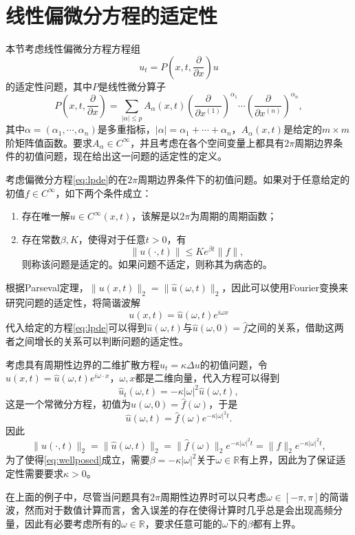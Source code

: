 \documentclass[a4paper,10pt]{ctexart}
\begin{document}
\section{线性偏微分方程的适定性}
本节考虑线性偏微分方程方程组
\begin{equation}\label{eq:lpde}
    u_t = P( x,t,\dfrac{\partial }{\partial x})u 
\end{equation}
的适定性问题，其中$ P $是线性微分算子
\begin{equation}
    P(x,t,\dfrac{\partial }{\partial x}) = \sum_{|\alpha|\leqslant p} A_\alpha(x,t) \left( \dfrac{\partial }{\partial x^{(1)}}  \right)^{\alpha_1} \cdots \left( \dfrac{\partial }{\partial x^{(n)}}  \right)^{\alpha_n},
\end{equation}
其中$ \alpha = (\alpha_1,\cdots,\alpha_n) $是多重指标，$ |\alpha| = \alpha_1 + \cdots + \alpha_n $，$ A_\alpha(x,t) $是给定的$ m\times m $阶矩阵值函数。要求$ A_\alpha\in C^\infty $，并且考虑在各个空间变量上都具有$ 2\pi $周期边界条件的初值问题，现在给出这一问题的适定性的定义。
\begin{definition}
    考虑偏微分方程\eqref{eq:lpde}的在$ 2\pi $周期边界条件下的初值问题。如果对于任意给定的初值$ f\in C^\infty $，如下两个条件成立：
    \begin{enumerate}
        \item 存在唯一解$ u\in C^\infty(x,t) $，该解是以$ 2\pi $为周期的周期函数；
        \item 存在常数$ \beta,K $，使得对于任意$ t>0 $，有
        \begin{equation}\label{eq:wellposed}
            \| u(\cdot,t) \| \leqslant Ke^{\beta t} \| f \|,
        \end{equation}
        则称该问题是适定的。如果问题不适定，则称其为病态的。
    \end{enumerate}
\end{definition}

根据Parseval定理，$ \| u(x,t) \|_2 = \| \hat{u}(\omega,t) \|_2 $，因此可以使用Fourier变换来研究问题的适定性，将简谐波解
\begin{equation}
    u(x,t) = \hat{u}(\omega,t)e^{i \omega x}
\end{equation}
代入给定的方程\eqref{eq:lpde}可以得到$ \hat{u}(\omega,t) $与$ \hat{u}(\omega,0)=\hat{f} $之间的关系，借助这两者之间增长的关系可以判断问题的适定性。

\begin{example}
    考虑具有周期性边界的二维扩散方程$ u_t = \kappa\Delta u $的初值问题，令$ u(x,t) = \hat{u}(\omega,t)e^{i \omega\cdot x} $，$ \omega,x $都是二维向量，代入方程可以得到
    \[
        \hat{u}_t(\omega,t) = -\kappa |\omega|^2 \hat{u}(\omega,t),
    \]
    这是一个常微分方程，初值为$ \hat{u}(\omega,0) = \hat{f}(\omega) $，于是
    \begin{equation}
        \hat{u}(\omega,t) = \hat{f}(\omega)e^{-\kappa |\omega|^2 t}.
    \end{equation}
    因此
    \[
        \| u(\cdot,t) \|_2 = \| \hat{u}(\omega,t) \|_2 = \| \hat{f}(\omega) \|_2 e^{-\kappa |\omega|^2 t} = \| f \|_2 e^{-\kappa |\omega|^2 t},
    \]
    为了使得\eqref{eq:wellposed}成立，需要$ \beta = -\kappa |\omega|^2 $关于$ \omega\in \mathbb{R} $有上界，因此为了保证适定性需要要求$ \kappa >0 $。
\end{example}

在上面的例子中，尽管当问题具有$ 2\pi $周期性边界时可以只考虑$ \omega\in [-\pi,\pi] $的简谐波，然而对于数值计算而言，舍入误差的存在使得计算时几乎总是会出现高频分量，因此有必要考虑所有的$ \omega\in \mathbb{R} $，要求任意可能的$ \omega $下的$ \beta $都有上界。
\end{document}

